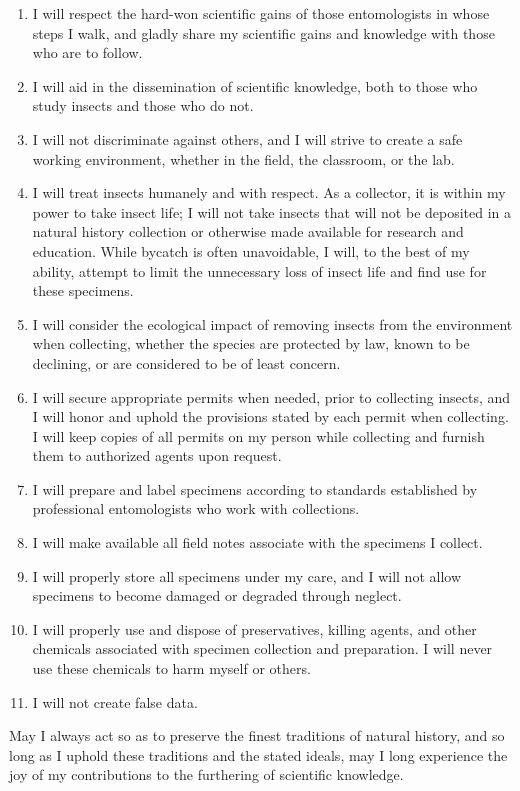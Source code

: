 \documentclass[letterpaper, 10pt]{article}
\begin{document}
\begin{enumerate}
\item I will respect the hard-won scientific gains of those entomologists in whose steps I walk, and gladly share my scientific gains and knowledge with those who are to follow.
\item I will aid in the dissemination of scientific knowledge, both to those who study insects and those who do not.
\item I will not discriminate against others, and I will strive to create a safe working environment, whether in the field, the classroom, or the lab.
\item I will treat insects humanely and with respect. As a collector, it is within my power to take insect life; I will not take insects that will not be deposited in a natural history collection or otherwise made available for research and education. While bycatch is often unavoidable, I will, to the best of my ability, attempt to limit the unnecessary loss of insect life and find use for these specimens.  
\item I will consider the ecological impact of removing insects from the environment when collecting, whether the species are protected by law, known to be declining, or are considered to be of least concern.
\item I will secure appropriate permits when needed, prior to collecting insects, and I will honor and uphold the provisions stated by each permit when collecting. I will keep copies of all permits on my person while collecting and furnish them to authorized agents upon request.
\item I will prepare and label specimens according to standards established by professional entomologists who work with collections. 
\item I will make available all field notes associate with the specimens I collect. 
\item I will properly store all specimens under my care, and I will not allow specimens to become damaged or degraded through neglect.
\item I will properly use and dispose of preservatives, killing agents, and other chemicals associated with specimen collection and preparation. I will never use these chemicals to harm myself or others.
\item I will not create false data.
\end{enumerate}
 
\noindent{}May I always act so as to preserve the finest traditions of natural history, and so long as I uphold  these traditions and the stated ideals, may I long experience the joy of my contributions to the furthering of scientific knowledge. 
\vfill
\end{document}
